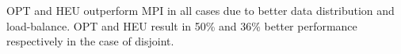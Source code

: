 OPT and HEU outperform MPI in all cases due to better data distribution and load-balance. OPT and HEU result in 50\% and 36\% better performance respectively in the case of disjoint. 
\begin{comment}
\begin{table*}%
   \centering
    \begin{tabular}{| p{0.75cm} | p{0.3cm} | p{0.3cm} | p{0.3cm} | p{0.3cm} | p{0.3cm} | p{0.3cm} | p{0.3cm} | p{0.3cm} | p{0.3cm} | p{0.3cm} | p{0.3cm} | p{0.3cm} | p{0.3cm} | p{0.3cm} |p{0.3cm} | p{0.3cm} |p{0.3cm} | p{0.3cm} |p{0.3cm} | p{0.3cm} | p{0.3cm} | p{0.5cm} |p{0.3cm} |}
    \hline
     Configs & \multicolumn{4}{ c | }{Config 1} & \multicolumn{4}{ c| }{Config 2} & \multicolumn{4}{ c| }{Config 3} & \multicolumn{4}{ c| } {Config 4} & \multicolumn{4}{ c| }{Config 5} & \multicolumn{3}{ c| }{Average}\\ \hline
     Patterns & OPT & HEU & MPI & Dist & OPT & HEU & MPI & Dist & OPT & HEU & MPI & Dist & OPT & HEU & MPI & Dist & OPT & HEU & MPI & Dist & OPT & HEU & MPI \\ \hline
     Disjoint & 83  & 71 & 50 & 8.41 & 81 & 75  & 54 & 8.35 & 85  & 77 &  55 & 8.32 & 89  & 88 &  62 & 8.50 &  84 & 71 & 59 & 8.45 & 84.4 & 76.4 & 56.0 \\ \hline
     Overlap  & 89  & 72 & 52 & 6.54 & 86 & 67  & 60 & 6.53 & 94 & 71 &  64 & 6.55 & 98 & 68 &  57 & 6.50 & 88 & 78 & 59 & 6.43 & 91.0  & 71.2 & 58.4 \\ \hline
     Subset   & 92  & 72 & 55 & 6.40 & 91 & 68  & 60 & 6.26 & 89  & 63 &  52 & 6.27 & 94  & 80 & 51 & 6.33 & 96  & 68 & 57 & 6.39 & 92.4 & 70.2 & 55.0 \\ \hline
    \end{tabular}
    \caption{\small Throughput (GB/s) for MPI\_Alltoallv (MPI), Optimization (Opt), Heuristic (Heu) and average number of hops (Dist) between sources and destinations for 5 different random pairings (Config) of sources and destinations in 1024-node partition.}
    \label{table:random_1024}
\end{table*}
\end{comment}

